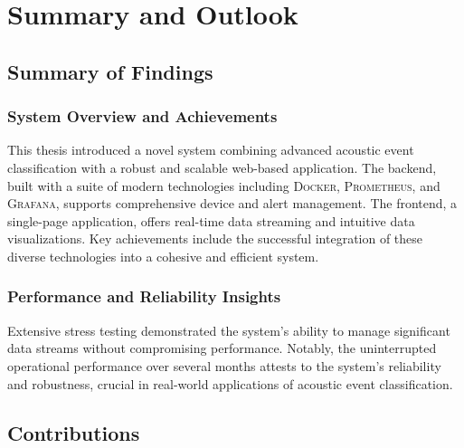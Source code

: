 \chapter{Summary and Outlook}
\section{Summary of Findings}
\subsection{System Overview and Achievements}

This thesis introduced a novel system combining advanced acoustic event classification with a robust and scalable web-based application. The backend, built with a suite of modern technologies including \textsc{Docker}, \textsc{Prometheus}, and \textsc{Grafana}, supports comprehensive device and alert management. The frontend, a single-page application, offers real-time data streaming and intuitive data visualizations. Key achievements include the successful integration of these diverse technologies into a cohesive and efficient system.

\subsection{Performance and Reliability Insights}

Extensive stress testing demonstrated the system's ability to manage significant data streams without compromising performance. Notably, the uninterrupted operational performance over several months attests to the system's reliability and robustness, crucial in real-world applications of acoustic event classification.

\section{Contributions}
